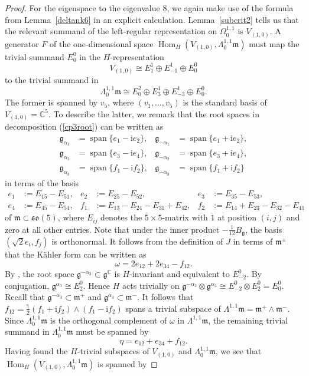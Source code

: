 \documentclass[12pt]{scrartcl}
\theoremstyle{plain}
\theoremstyle{definition}
\newcommand{\C}{\mathbb{C}}%
\newcommand{\Hom}{\operatorname{Hom}}%
\newcommand{\so}{\mathfrak{so}}%
\newcommand{\spann}{\operatorname{span}}%
\renewcommand{\i}{\mathrm{i}}%
\newcommand{\m}{\mathfrak{m}}%
\newcommand{\g}{\mathfrak{g}}%
\begin{document}
\begin{proof}
For the eigenspace to the eigenvalue $8$, we again make use of the formula from Lemma~\ref{deltank6} in an explicit calculation. Lemma~\ref{subcrit2} tells us that the relevant summand of the left-regular representation on $\Omega^{1,1}_0$ is $V_{(1,0)}$. A generator $F$ of the one-dimensional space $\Hom_H(V_{(1,0)},\Lambda^{1,1}_0\m)$ must map the trivial summand $E^0_0$ in the $H$-representation
\[V_{(1,0)}\cong E^1_1\oplus E^1_{-1}\oplus E^0_0\]
to the trivial summand in
\[\Lambda^{1,1}_0\m\cong E^2_0\oplus E^1_3\oplus E^1_{−3}\oplus E^0_0.\]
The former is spanned by $v_5$, where $(v_1,\ldots,v_5)$ is the standard basis of $V_{(1,0)}=\C^5$. To describe the latter, we remark that the root spaces in decomposition (\ref{cp3root}) can be written as
\begin{align*}
\g_{\alpha_1}&=\spann\{e_1-\i e_2\},&\g_{-\alpha_1}&=\spann\{e_1+\i e_2\},\\
\g_{\alpha_2}&=\spann\{e_3-\i e_4\},&\g_{-\alpha_2}&=\spann\{e_3+\i e_4\},\\
\g_{\alpha_3}&=\spann\{f_1-\i f_2\},&\g_{-\alpha_3}&=\spann\{f_1+\i f_2\}
\end{align*}
in terms of the basis
\begin{align*}
e_1&:=E_{15}-E_{51},&e_2&:=E_{25}-E_{52},&e_3&:=E_{35}-E_{53},\\
e_4&:=E_{45}-E_{54},&f_1&:=E_{13}-E_{24}-E_{31}+E_{42},&f_2&:=E_{14}+E_{23}-E_{32}-E_{41}
\end{align*}
of $\m\subset\so(5)$, where $E_{ij}$ denotes the $5\times5$-matrix with $1$ at position $(i,j)$ and zero at all other entries. Note that under the inner product $-\frac{1}{12}B_{\g}$, the basis $(\sqrt{2}e_i,f_j)$ is orthonormal. It follows from the definition of $J$ in terms of $\m^\pm$ that the Kähler form can be written as
\[\omega=2e_{12}+2e_{34}-f_{12}.\]
By \cite[(32)]{hermitianlaplace}, the root space $\g^{-\alpha_3}\subset\g^\C$ is $H$-invariant and equivalent to $E^0_{-2}$. By conjugation, $\g^{\alpha_3}\cong E^0_2$. Hence $H$ acts trivially on $\g^{-\alpha_3}\otimes\g^{\alpha_3}\cong E^0_{-2}\otimes E^0_2=E^0_0$. Recall that $\g^{-\alpha_3}\subset\m^+$ and $\g^{\alpha_3}\subset\m^-$. It follows that $f_{12}=\frac{\i}{2}(f_1+\i f_2)\wedge(f_1-\i f_2)$ spans a trivial subspace of $\Lambda^{1,1}\m=\m^+\wedge\m^-$. Since $\Lambda^{1,1}_0\m$ is the orthogonal complement of $\omega$ in $\Lambda^{1,1}\m$, the remaining trivial summand in $\Lambda^{1,1}_0\m$ must be spanned by
\[\eta=e_{12}+e_{34}+f_{12}.\]
Having found the $H$-trivial subspaces of $V_{(1,0)}$ and $\Lambda^{1,1}_0\m$, we see that $\Hom_H(V_{(1,0)},\Lambda^{1,1}_0\m)$ is spanned by

\end{proof}
\end{document}
